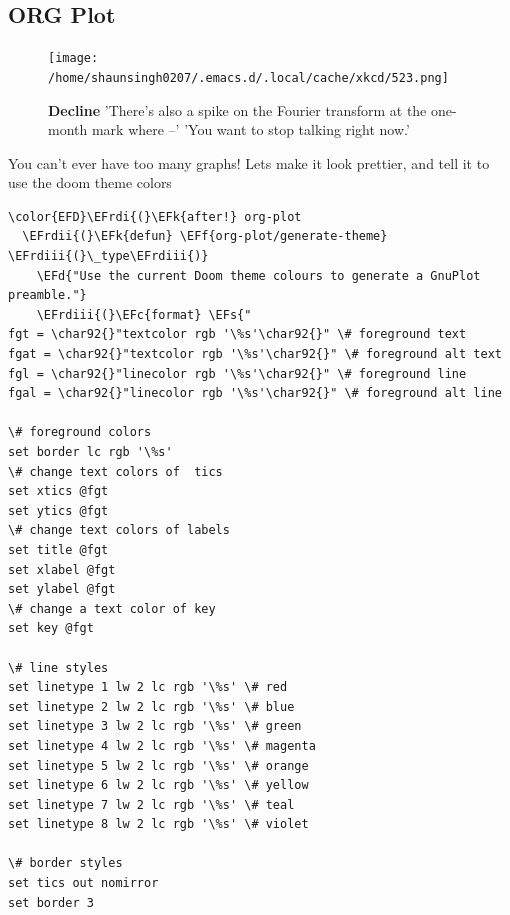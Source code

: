 \documentclass{scrartcl}
\newcommand{\EFk}[1]{\textcolor{EFk}{#1}} %
\newcommand{\EFd}[1]{\textcolor{EFd}{\textit{#1}}} %
\newcommand{\EFs}[1]{\textcolor{EFs}{#1}} %
\newcommand{\EFc}[1]{\textcolor{EFc}{#1}} %
\newcommand{\EFf}[1]{\textcolor{EFf}{#1}} %
\newcommand{\EFrdi}[1]{\textcolor{EFrdi}{#1}} %
\newcommand{\EFrdii}[1]{\textcolor{EFrdii}{#1}} %
\newcommand{\EFrdiii}[1]{\textcolor{EFrdiii}{#1}} %
\begin{document}
\subsection{ORG Plot}
\label{sec:orgd67bd7e}

\begin{figure}[!htb]
	  \centering
	  \texttt{[image: /home/shaunsingh0207/.emacs.d/.local/cache/xkcd/523.png]}
  \caption*{\label{xkcd:523} \textbf{Decline} 'There's also a spike on the Fourier transform at the one-month mark where --' 'You want to stop talking right now.'}
	\end{figure}

You can't ever have too many graphs! Lets make it look prettier, and tell it to use the doom theme colors
\begin{Code}
\begin{Verbatim}[]
\color{EFD}\EFrdi{(}\EFk{after!} org-plot
  \EFrdii{(}\EFk{defun} \EFf{org-plot/generate-theme} \EFrdiii{(}\_type\EFrdiii{)}
    \EFd{"Use the current Doom theme colours to generate a GnuPlot preamble."}
    \EFrdiii{(}\EFc{format} \EFs{"
fgt = \char92{}"textcolor rgb '\%s'\char92{}" \# foreground text
fgat = \char92{}"textcolor rgb '\%s'\char92{}" \# foreground alt text
fgl = \char92{}"linecolor rgb '\%s'\char92{}" \# foreground line
fgal = \char92{}"linecolor rgb '\%s'\char92{}" \# foreground alt line

\# foreground colors
set border lc rgb '\%s'
\# change text colors of  tics
set xtics @fgt
set ytics @fgt
\# change text colors of labels
set title @fgt
set xlabel @fgt
set ylabel @fgt
\# change a text color of key
set key @fgt

\# line styles
set linetype 1 lw 2 lc rgb '\%s' \# red
set linetype 2 lw 2 lc rgb '\%s' \# blue
set linetype 3 lw 2 lc rgb '\%s' \# green
set linetype 4 lw 2 lc rgb '\%s' \# magenta
set linetype 5 lw 2 lc rgb '\%s' \# orange
set linetype 6 lw 2 lc rgb '\%s' \# yellow
set linetype 7 lw 2 lc rgb '\%s' \# teal
set linetype 8 lw 2 lc rgb '\%s' \# violet

\# border styles
set tics out nomirror
set border 3


\end{Verbatim}
\end{Code}
\end{document}

